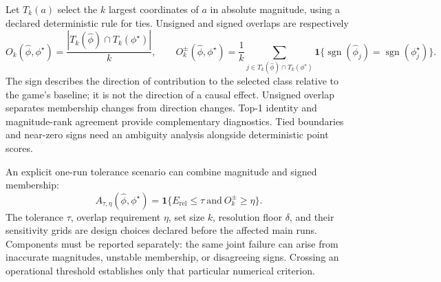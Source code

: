 Let $T_k(a)$ select the $k$ largest coordinates of $a$ in absolute magnitude, using a declared deterministic rule for ties. Unsigned and signed overlaps are respectively
\begin{equation}
 O_k(\widehat\phi,\phi^\star)=
 \frac{|T_k(\widehat\phi)\cap T_k(\phi^\star)|}{k},
 \qquad
 O_k^{\pm}(\widehat\phi,\phi^\star)=
 \frac{1}{k}\sum_{j\in T_k(\widehat\phi)\cap T_k(\phi^\star)}
 \mathbf{1}\{\operatorname{sgn}(\widehat\phi_j)=\operatorname{sgn}(\phi^\star_j)\}.
 \label{eq:overlap}
\end{equation}
The sign describes the direction of contribution to the selected class relative to the game's baseline; it is not the direction of a causal effect. Unsigned overlap separates membership changes from direction changes. Top-1 identity and magnitude-rank agreement provide complementary diagnostics. Tied boundaries and near-zero signs need an ambiguity analysis alongside deterministic point scores.

An explicit one-run tolerance scenario can combine magnitude and signed membership:
\begin{equation}
 A_{\tau,\eta}(\widehat\phi,\phi^\star)
 =\mathbf{1}\{E_{\mathrm{rel}}\leq\tau\ \text{and}\ O_k^{\pm}\geq\eta\}.
 \label{eq:adequacy-details}
\end{equation}
The tolerance $\tau$, overlap requirement $\eta$, set size $k$, resolution floor $\delta$, and their sensitivity grids are design choices declared before the affected main runs. Components must be reported separately: the same joint failure can arise from inaccurate magnitudes, unstable membership, or disagreeing signs. Crossing an operational threshold establishes only that particular numerical criterion.

